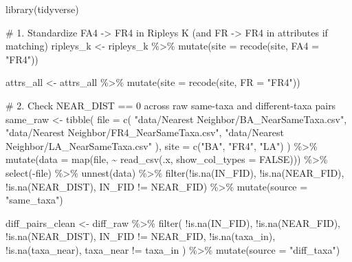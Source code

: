 \documentclass[
  letterpaper,
  DIV=11,
  numbers=noendperiod]{scrartcl}
\newenvironment{Shaded}{\begin{snugshade}}{\end{snugshade}}
\newcommand{\AttributeTok}[1]{\textcolor[rgb]{0.40,0.45,0.13}{#1}}
\newcommand{\CommentTok}[1]{\textcolor[rgb]{0.37,0.37,0.37}{#1}}
\newcommand{\ConstantTok}[1]{\textcolor[rgb]{0.56,0.35,0.01}{#1}}
\newcommand{\FunctionTok}[1]{\textcolor[rgb]{0.28,0.35,0.67}{#1}}
\newcommand{\NormalTok}[1]{\textcolor[rgb]{0.00,0.23,0.31}{#1}}
\newcommand{\OtherTok}[1]{\textcolor[rgb]{0.00,0.23,0.31}{#1}}
\newcommand{\SpecialCharTok}[1]{\textcolor[rgb]{0.37,0.37,0.37}{#1}}
\newcommand{\StringTok}[1]{\textcolor[rgb]{0.13,0.47,0.30}{#1}}
\begin{document}
\begin{Shaded}
\begin{Highlighting}[]
\FunctionTok{library}\NormalTok{(tidyverse)}

\CommentTok{\# 1. Standardize FA4 {-}\textgreater{} FR4 in Ripley\textquotesingle{}s K (and FR {-}\textgreater{} FR4 in attributes if matching)}
\NormalTok{ripleys\_k }\OtherTok{\textless{}{-}}\NormalTok{ ripleys\_k }\SpecialCharTok{\%\textgreater{}\%}
  \FunctionTok{mutate}\NormalTok{(}\AttributeTok{site =} \FunctionTok{recode}\NormalTok{(site, }\AttributeTok{FA4 =} \StringTok{"FR4"}\NormalTok{))}

\NormalTok{attrs\_all }\OtherTok{\textless{}{-}}\NormalTok{ attrs\_all }\SpecialCharTok{\%\textgreater{}\%}
  \FunctionTok{mutate}\NormalTok{(}\AttributeTok{site =} \FunctionTok{recode}\NormalTok{(site, }\AttributeTok{FR =} \StringTok{"FR4"}\NormalTok{))}

\CommentTok{\# 2. Check NEAR\_DIST == 0 across raw same{-}taxa and different{-}taxa pairs}
\NormalTok{same\_raw }\OtherTok{\textless{}{-}} \FunctionTok{tibble}\NormalTok{(}
  \AttributeTok{file =} \FunctionTok{c}\NormalTok{(}
    \StringTok{"data/Nearest Neighbor/BA\_NearSameTaxa.csv"}\NormalTok{,}
    \StringTok{"data/Nearest Neighbor/FR4\_NearSameTaxa.csv"}\NormalTok{,}
    \StringTok{"data/Nearest Neighbor/LA\_NearSameTaxa.csv"}
\NormalTok{  ),}
  \AttributeTok{site =} \FunctionTok{c}\NormalTok{(}\StringTok{"BA"}\NormalTok{, }\StringTok{"FR4"}\NormalTok{, }\StringTok{"LA"}\NormalTok{)}
\NormalTok{) }\SpecialCharTok{\%\textgreater{}\%}
  \FunctionTok{mutate}\NormalTok{(}\AttributeTok{data =} \FunctionTok{map}\NormalTok{(file, }\SpecialCharTok{\textasciitilde{}} \FunctionTok{read\_csv}\NormalTok{(.x, }\AttributeTok{show\_col\_types =} \ConstantTok{FALSE}\NormalTok{))) }\SpecialCharTok{\%\textgreater{}\%}
  \FunctionTok{select}\NormalTok{(}\SpecialCharTok{{-}}\NormalTok{file) }\SpecialCharTok{\%\textgreater{}\%}
  \FunctionTok{unnest}\NormalTok{(data) }\SpecialCharTok{\%\textgreater{}\%}
  \FunctionTok{filter}\NormalTok{(}\SpecialCharTok{!}\FunctionTok{is.na}\NormalTok{(IN\_FID), }\SpecialCharTok{!}\FunctionTok{is.na}\NormalTok{(NEAR\_FID), }\SpecialCharTok{!}\FunctionTok{is.na}\NormalTok{(NEAR\_DIST), IN\_FID }\SpecialCharTok{!=}\NormalTok{ NEAR\_FID) }\SpecialCharTok{\%\textgreater{}\%}
  \FunctionTok{mutate}\NormalTok{(}\AttributeTok{source =} \StringTok{"same\_taxa"}\NormalTok{)}

\NormalTok{diff\_pairs\_clean }\OtherTok{\textless{}{-}}\NormalTok{ diff\_raw }\SpecialCharTok{\%\textgreater{}\%}
  \FunctionTok{filter}\NormalTok{(}
    \SpecialCharTok{!}\FunctionTok{is.na}\NormalTok{(IN\_FID), }\SpecialCharTok{!}\FunctionTok{is.na}\NormalTok{(NEAR\_FID), }\SpecialCharTok{!}\FunctionTok{is.na}\NormalTok{(NEAR\_DIST),}
\NormalTok{    IN\_FID }\SpecialCharTok{!=}\NormalTok{ NEAR\_FID,}
    \SpecialCharTok{!}\FunctionTok{is.na}\NormalTok{(taxa\_in), }\SpecialCharTok{!}\FunctionTok{is.na}\NormalTok{(taxa\_near),}
\NormalTok{    taxa\_near }\SpecialCharTok{!=}\NormalTok{ taxa\_in}
\NormalTok{  ) }\SpecialCharTok{\%\textgreater{}\%}
  \FunctionTok{mutate}\NormalTok{(}\AttributeTok{source =} \StringTok{"diff\_taxa"}\NormalTok{)}


\end{Highlighting}
\end{Shaded}
\end{document}
